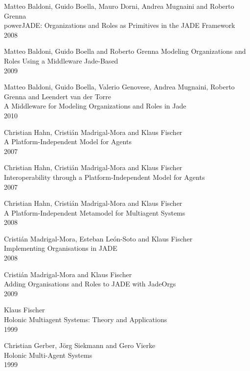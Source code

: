 \begin{thebibliography}{99}
Matteo Baldoni, Guido Boella, Mauro Dorni, Andrea Mugnaini and Roberto Grenna\\
powerJADE: Organizations and Roles as Primitives in the JADE Framework\\
2008

Matteo Baldoni, Guido Boella and Roberto Grenna
Modeling Organizations and Roles Using a Middleware Jade-Based\\
2009

Matteo Baldoni, Guido Boella, Valerio Genovese, Andrea Mugnaini, Roberto Grenna and Leendert van der Torre\\
A Middleware for Modeling Organizations and Roles in Jade\\
2010


Christian Hahn, Cristián Madrigal-Mora and Klaus Fischer\\
A Platform-Independent Model for Agents\\
2007

Christian Hahn, Cristián Madrigal-Mora and Klaus Fischer\\
Interoperability through a Platform-Independent Model for Agents\\
2007

Christian Hahn, Cristián Madrigal-Mora and Klaus Fischer\\
A Platform-Independent Metamodel for Multiagent Systems\\
2008

Cristián Madrigal-Mora, Esteban León-Soto and Klaus Fischer\\
Implementing Organisations in JADE\\
2008

Cristián Madrigal-Mora and Klaus Fischer\\
Adding Organisations and Roles to JADE with JadeOrgs\\
2009


Klaus Fischer\\
Holonic Multiagent Systems: Theory and Applications\\
1999

Christian Gerber, J\"{o}rg Siekmann and Gero Vierke\\
Holonic Multi-Agent Systems\\
1999


\end{thebibliography}
